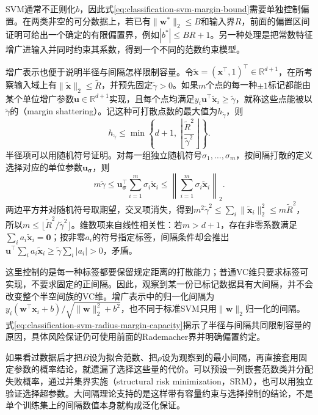 SVM通常不正则化$b$，因此式\eqref{eq:classification-svm-margin-bound}需要单独控制偏置。在两类非空的可分数据上，若已有$\lVert\bm{w}^{\ast}\rVert_2\le B$和输入界$R$，前面的偏置区间证明可给出一个确定的有限偏置界，例如$|b^{\ast}|\le BR+1$。另一种处理是把常数特征增广进输入并同时约束其系数，得到一个不同的范数约束模型。

增广表示也便于说明半径与间隔怎样限制容量。令$\widetilde{\bm{x}}=(\bm{x}^{\top},1)^{\top}\in\mathbb{R}^{d+1}$，在所考察输入域上有$\lVert\widetilde{\bm{x}}\rVert_2\le\widetilde R$，并预先固定$\widetilde\gamma>0$。如果$m$个点的每一种$\pm1$标记都能由某个单位增广参数$\bm{u}\in\mathbb{R}^{d+1}$实现，且每个点均满足$y_i\bm{u}^{\top}\widetilde{\bm{x}}_i\ge\widetilde\gamma$，就称这些点能被以$\widetilde\gamma$的（margin shattering）。记这种可打散点数的最大值为$h_{\widetilde\gamma}$，则
\begin{equation}
  h_{\widetilde\gamma}
  \le\min\left\{
      d+1,\left\lfloor
        \frac{\widetilde R^2}{\widetilde\gamma^2}
      \right\rfloor
    \right\}.
  \label{eq:classification-svm-radius-margin-capacity}
\end{equation}
半径项可以用随机符号证明。对每一组独立随机符号$\sigma_1,\ldots,\sigma_m$，按间隔打散的定义选择对应的单位参数$\bm{u}_{\bm{\sigma}}$，则
\[
  m\widetilde\gamma
  \le\bm{u}_{\bm{\sigma}}^{\top}
       \sum_{i=1}^m\sigma_i\widetilde{\bm{x}}_i
  \le\left\lVert
       \sum_{i=1}^m\sigma_i\widetilde{\bm{x}}_i
     \right\rVert_2.
\]
两边平方并对随机符号取期望，交叉项消失，得到$m^2\widetilde\gamma^2\le\sum_i\lVert\widetilde{\bm{x}}_i\rVert_2^2\le m\widetilde R^2$，所以$m\le\lfloor\widetilde R^2/\widetilde\gamma^2\rfloor$。维数项来自线性相关性：若$m>d+1$，存在非零系数满足$\sum_i a_i\widetilde{\bm{x}}_i=\bm{0}$；按非零$a_i$的符号指定标签，间隔条件却会推出$\bm{u}^{\top}\sum_i a_i\widetilde{\bm{x}}_i\ge\widetilde\gamma\sum_i|a_i|>0$，矛盾。

这里控制的是每一种标签都要保留规定距离的打散能力；普通VC维只要求标签可实现，不要求固定的正间隔。因此，观察到某一份已标记数据具有大间隔，并不会改变整个半空间族的VC维。增广表示中的归一化间隔为$y_i(\bm{w}^{\top}\bm{x}_i+b)/\sqrt{\lVert\bm{w}\rVert_2^2+b^2}$，也不同于标准SVM只用$\lVert\bm{w}\rVert_2$归一化的间隔。式\eqref{eq:classification-svm-radius-margin-capacity}揭示了半径与间隔共同限制容量的原因，具体风险保证仍可使用前面的Rademacher界并明确偏置约定。

如果看过数据后才把$B$设为拟合范数、把$\rho$设为观察到的最小间隔，再直接套用固定参数的概率结论，就遗漏了选择这些量的代价。可以预设一列嵌套范数类并分配失败概率，通过并集界实施（structural risk minimization，SRM），也可以用独立验证选择超参数。大间隔理论支持的是这样带有容量约束与选择控制的结论，不是单个训练集上的间隔数值本身就构成泛化保证。

